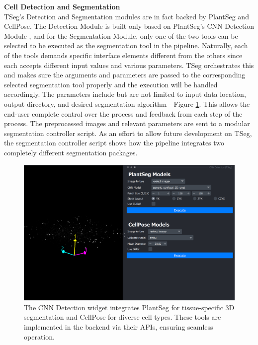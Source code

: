 \documentclass[./dissertation.tex]{subfiles}
\begin{document}





\textbf{Cell Detection and Segmentation} \\
TSeg's Detection and Segmentation modules are in fact backed by PlantSeg and CellPose. The Detection Module is built only based on PlantSeg's CNN Detection Module \cite{plantseg}, and for the Segmentation Module, only one of the two tools can be selected to be executed as the segmentation tool in the pipeline. Naturally, each of the tools demands specific interface elements different from the others since each accepts different input values and various parameters. TSeg orchestrates this and makes sure the arguments and parameters are passed to the corresponding selected segmentation tool properly and the execution will be handled accordingly. The parameters include but are not limited to input data location, output directory, and desired segmentation algorithm - Figure \ref{fig:cnn_detection}. This allows the end-user complete control over the process and feedback from each step of the process. The preprocessed images and relevant parameters are sent to a modular segmentation controller script. As an effort to allow future development on TSeg, the segmentation controller script shows how the pipeline integrates two completely different segmentation packages.

\begin{figure}[h]
    \centering\includegraphics[width=.7\textwidth]{figures/tseg/cnn widget.png}
    \caption{The CNN Detection widget integrates PlantSeg for tissue-specific 3D segmentation and CellPose for diverse cell types. These tools are implemented in the backend via their APIs, ensuring seamless operation.}
    \label{fig:cnn_detection}
\end{figure}
\end{document}
